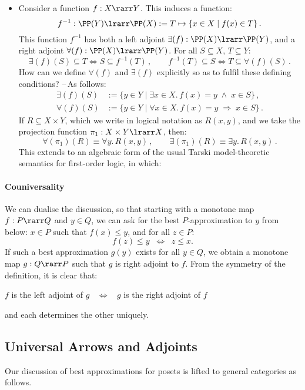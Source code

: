 \documentclass[12pt]{article}
\begin{document}
\begin{itemize}
%
\item Consider a function $f : X \rarr Y$. This induces a function:
\[ f^{-1} : \PP(Y) \lrarr \PP(X) := T \mapsto \{ x \in X \mid f(x) \in T \}\,. \]
This function $f^{-1}$ has both a left adjoint $\exists (f) : \PP(X) \lrarr \PP(Y)$, and a right adjoint $\forall (f) : \PP(X) \lrarr \PP(Y)$. For all
$S \subseteq X$, $T \subseteq Y$:
\[ \exists(f)(S) \subseteq T \iff S \subseteq f^{-1}(T)\,,\qquad  f^{-1}(T) \subseteq S \iff  T \subseteq \forall(f)(S)\,. \]
How can we define $\forall(f)$ and $\exists(f)$ explicitly so as to fulfil these defining conditions? --\,As follows:
\begin{align*}
\exists(f)(S) &:= \{ y \in Y \mid \exists x \in X. \, f(x) = y \; \wedge \; x \in S \}\,,  \\
\forall(f)(S) &:= \{ y \in Y \mid \forall x \in X. \, f(x) = y \; \Rightarrow \; x \in S \}\,.
\end{align*}
%
If $R \subseteq X \times Y$, which we write in logical notation as $R(x, y)$, and we take the projection function $\pi_{1} : X \times Y \lrarr X$,
then:
\[ \forall(\pi_{1})(R) \equiv \forall y. \, R(x, y)\,, \qquad \exists(\pi_{1})(R) \equiv \exists y. \, R(x, y)\,. \]
%
This extends to an algebraic form of the usual Tarski model-theoretic semantics for first-order logic, in which:
\begin{center}
\end{center}
\end{itemize}

\paragraph{Couniversality}
We can dualise the discussion, so that starting with a monotone map $f : P \rarr Q$ and $y \in Q$, we can ask for the best $P$-approximation to $y$ from below: $x \in P$ such that $f(x) \leq y$, and for all $z \in P$:
\[ f(z) \leq y \;\; \Longleftrightarrow \;\; z \leq x . \]
%
If such a best approximation $g(y)$ exists for all $y \in Q$, we obtain a monotone map $g : Q \rarr P$ such that $g$ is right adjoint to $f$.
From the symmetry of the definition, it is clear that:
\begin{center}
 $f$ is the left adjoint of $g$ $\;\; \Longleftrightarrow \;\;$ $g$ is the right adjoint of $f$
\end{center}
and each determines the other uniquely.

\subsection{Universal Arrows and Adjoints}
Our discussion of best approximations for posets is lifted to general categories as follows.
\end{document}
